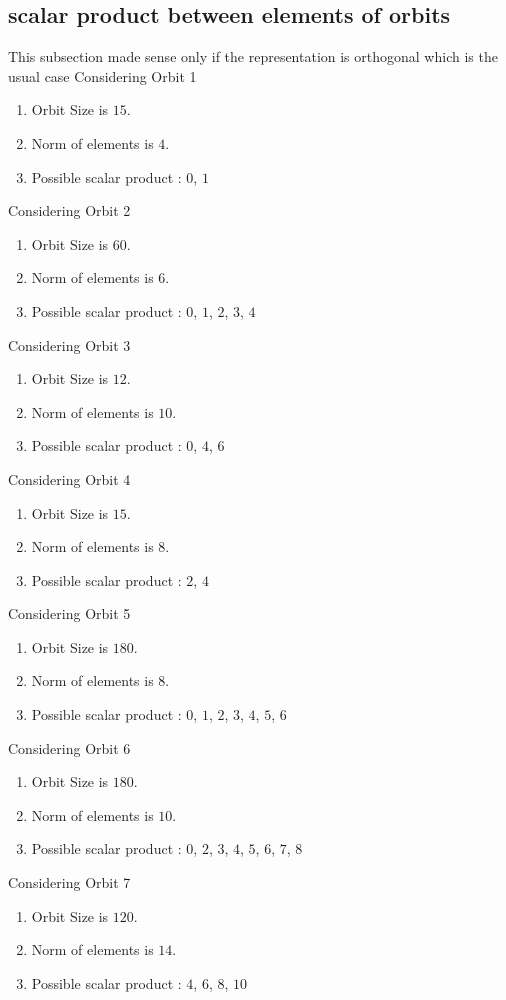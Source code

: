 \documentclass[12pt]{article}
\begin{document}
\subsection{scalar product between elements of orbits}
\noindent This subsection made sense only if the representation is orthogonal which is the usual case
Considering Orbit 1
\begin{enumerate}
\item Orbit Size is $15$.
\item Norm of elements is $4$.
\item Possible scalar product : $0$, $1$
\end{enumerate}
Considering Orbit 2
\begin{enumerate}
\item Orbit Size is $60$.
\item Norm of elements is $6$.
\item Possible scalar product : $0$, $1$, $2$, $3$, $4$
\end{enumerate}
Considering Orbit 3
\begin{enumerate}
\item Orbit Size is $12$.
\item Norm of elements is $10$.
\item Possible scalar product : $0$, $4$, $6$
\end{enumerate}
Considering Orbit 4
\begin{enumerate}
\item Orbit Size is $15$.
\item Norm of elements is $8$.
\item Possible scalar product : $2$, $4$
\end{enumerate}
Considering Orbit 5
\begin{enumerate}
\item Orbit Size is $180$.
\item Norm of elements is $8$.
\item Possible scalar product : $0$, $1$, $2$, $3$, $4$, $5$, $6$
\end{enumerate}
Considering Orbit 6
\begin{enumerate}
\item Orbit Size is $180$.
\item Norm of elements is $10$.
\item Possible scalar product : $0$, $2$, $3$, $4$, $5$, $6$, $7$, $8$
\end{enumerate}
Considering Orbit 7
\begin{enumerate}
\item Orbit Size is $120$.
\item Norm of elements is $14$.
\item Possible scalar product : $4$, $6$, $8$, $10$
\end{enumerate}
\end{document}
